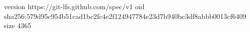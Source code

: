 version https://git-lfs.github.com/spec/v1
oid sha256:579d95c954b51cad1bc2fc4e2f124947784e23d7b940bc3df8abbb0013cf6409
size 4365
